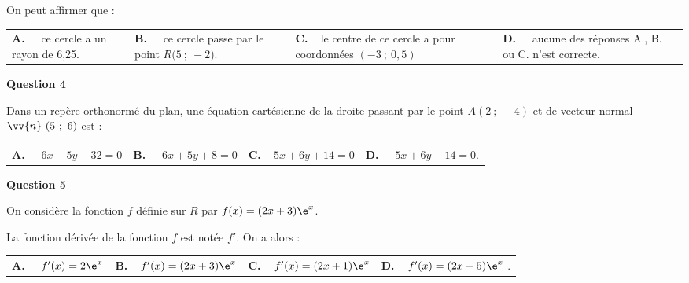 On peut affirmer que :

\medskip

\begin{tabularx}{\linewidth}{*{4}{X}}
\textbf{A.~~} ce cercle a un rayon
de 6,25. &\textbf{B.~~} ce cercle passe par
le point $R(5~;~-2$).&\textbf{C.~~}le centre de ce cercle a pour
coordonnées $(-3~;~0,5)$& \textbf{D.~~} aucune des réponses A., B. ou C. n'est
correcte.
\end{tabularx}

\medskip

\textbf{Question 4}

\medskip 

Dans un repère orthonormé du plan, une équation cartésienne de la droite passant par le
point $A(2~;~-4)$ et de vecteur normal $\vv{n} \ (5~;~6)$ est :

\medskip

\begin{tabularx}{\linewidth}{*{4}{X}}
\textbf{A.~~} $6x -5y - 32 = 0$ &\textbf{B.~~} $6x + 5y + 8 = 0
$&\textbf{C.~~}$5x+ 6y + 14 = 0$& \textbf{D.~~} $5x + 6y - 14 = 0$.
\end{tabularx}

\medskip

\textbf{Question 5}

\medskip 

On considère la fonction $f$ définie sur $R$ par $f(x) = (2x + 3)\e^x$.

La fonction dérivée de la fonction $f$ est notée $f'$. On a alors :

\medskip

\begin{tabularx}{\linewidth}{*{4}{X}}
\textbf{A.~~} $f'(x) = 2\e^x$ &\textbf{B.~~}$f'(x) = (2x + 3)\e^x$
 &\textbf{C.~~}$f'(x) = (2x + 1)\e^x$& \textbf{D.~~}$f'(x) = (2x + 5)\e^x$ .
\end{tabularx}

\vspace{0,5cm}
